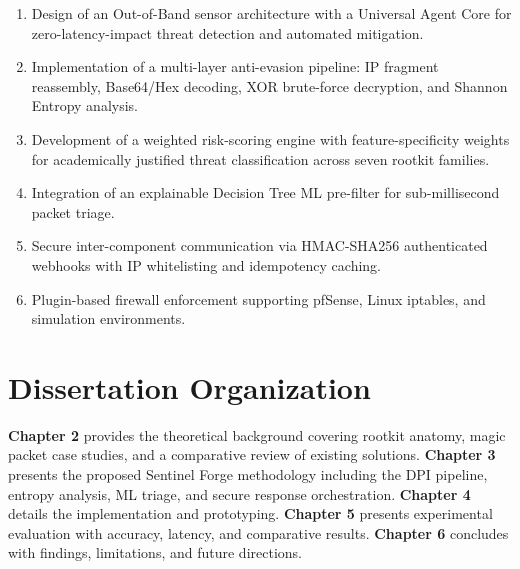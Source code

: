 \begin{enumerate}
    \item Design of an Out-of-Band sensor architecture with a Universal Agent Core for zero-latency-impact threat detection and automated mitigation.
    
    \item Implementation of a multi-layer anti-evasion pipeline: IP fragment reassembly, Base64/Hex decoding, XOR brute-force decryption, and Shannon Entropy analysis.
    
    \item Development of a weighted risk-scoring engine with feature-specificity weights for academically justified threat classification across seven rootkit families.
    
    \item Integration of an explainable Decision Tree ML pre-filter for sub-millisecond packet triage.
    
    \item Secure inter-component communication via HMAC-SHA256 authenticated webhooks with IP whitelisting and idempotency caching.
    
    \item Plugin-based firewall enforcement supporting pfSense, Linux iptables, and simulation environments.
\end{enumerate}

\section{Dissertation Organization}

\textbf{Chapter 2} provides the theoretical background covering rootkit anatomy, magic packet case studies, and a comparative review of existing solutions. \textbf{Chapter 3} presents the proposed Sentinel Forge methodology including the DPI pipeline, entropy analysis, ML triage, and secure response orchestration. \textbf{Chapter 4} details the implementation and prototyping. \textbf{Chapter 5} presents experimental evaluation with accuracy, latency, and comparative results. \textbf{Chapter 6} concludes with findings, limitations, and future directions.